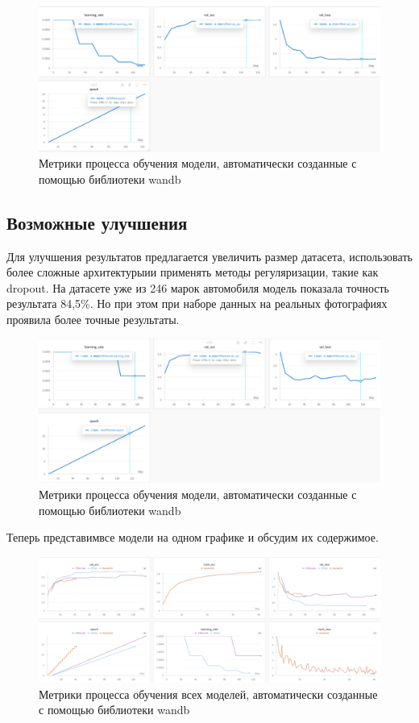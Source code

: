 \documentclass[14pt]{extarticle}
\begin{document}
\begin{figure}[H]
\centering
\includegraphics[width=16cm]{images/10.png}
\caption{Метрики процесса обучения модели, автоматически созданные с помощью библиотеки \foreignlanguage{english}{wandb}}
\label{fig:10}
\end{figure}

\subsection{Возможные улучшения}
\hspace{1cm}Для улучшения результатов предлагается увеличить размер датасета, использовать более сложные архитектурыии применять
методы регуляризации, такие как dropout. На датасете уже из 246 марок автомобиля модель показала точность результата
84,5\%. Но при этом при наборе данных на реальных фотографиях проявила более точные результаты.

\begin{figure}[H]
\centering
\includegraphics[width=16cm]{images/11.png}
\caption{Метрики процесса обучения модели, автоматически созданные с помощью библиотеки \foreignlanguage{english}{wandb}}
\label{fig:10}
\end{figure}

Теперь представимвсе модели на одном графике и обсудим их содержимое.

\begin{figure}[H]
\centering
\includegraphics[width=\textwidth]{images/30.png}
\caption{Метрики процесса обучения всех моделей, автоматически созданные с помощью библиотеки \foreignlanguage{english}{wandb}}
\label{fig:10}
\end{figure}
\end{document}
